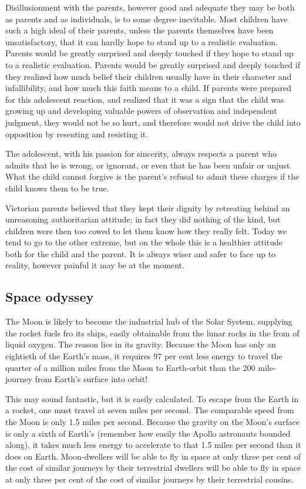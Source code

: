 \documentclass[11pt]{article}
\begin{document}
Disillusionment with the parents, however good and adequate they may be both as parents and as individuals, is to some degree inevitable. Most children have such a high ideal of their parents, unless the parents themselves have been unsatisfactory, that it can hardly hope to stand up to a realistic evaluation. Parents would be greatly surprised and deeply touched if they hope to stand up to a realistic evaluation. Parents would be greatly surprised and deeply touched if they realized how much belief their children usually have in their character and infallibility, and how much this faith means to a child. If parents were prepared for this adolescent reaction, and realized that it was a sign that the child was growing up and developing valuable powers of observation and independent judgment, they would not be so hurt, and therefore would not drive the child into opposition by resenting and resisting it.

The adolescent, with his passion for sincerity, always respects a parent who admits that he is wrong, or ignorant, or even that he has been unfair or unjust. What the child cannot forgive is the parent's refusal to admit these charges if the child knows them to be true.

Victorian parents believed that they kept their dignity by retreating behind an unreasoning authoritarian attitude; in fact they did nothing of the kind, but children were then too cowed to let them know how they really felt. Today we tend to go to the other extreme, but on the whole this is a healthier attitude both for the child and the parent. It is always wiser and safer to face up to reality, however painful it may be at the moment.
\subsection{Space odyssey}
\label{sec-2-35}

The Moon is likely to become the industrial hub of the Solar System, supplying the rocket fuels fro its ships, easily obtainable from the lunar rocks in the from of liquid oxygen. The reason lies in its gravity. Because the Moon has only an eightieth of the Earth's mass, it requires 97 per cent less energy to travel the quarter of a million miles from the Moon to Earth-orbit than the 200 mile-journey from Earth's surface into orbit!

This may sound fantastic, but it is easily calculated. To escape from the Earth in a rocket, one must travel at seven miles per second. The comparable speed from the Moon is only 1.5 miles per second. Because the gravity on the Moon's surface is only a sixth of Earth's (remember how easily the Apollo astronauts bounded along), it takes much less energy to accelerate to that 1.5 miles per second than it does on Earth. Moon-dwellers will be able to fly in space at only three per cent of the cost of similar journeys by their terrestrial dwellers will be able to fly in space at only three per cent of the cost of similar journeys by their terrestrial cousins.
\end{document}
